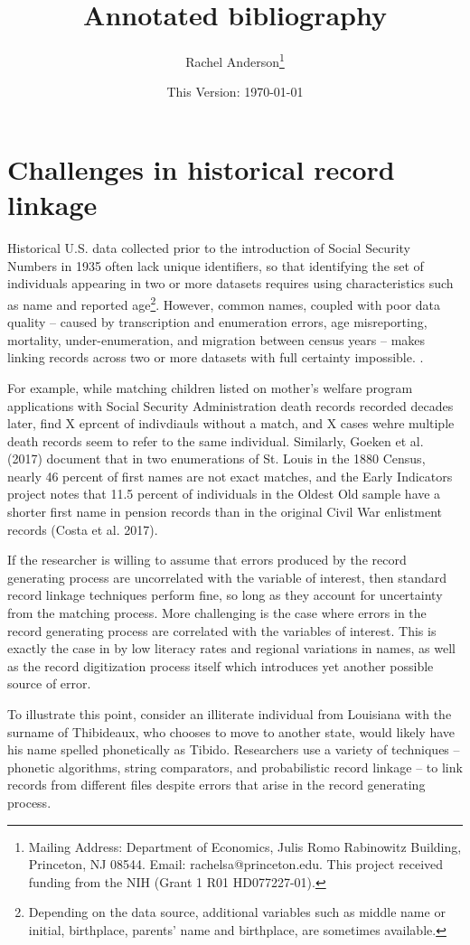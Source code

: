 \documentclass[12pt]{article}
\title{\singlespacing Annotated bibliography}
\author{\singlespacing \vspace{-50pt} Rachel Anderson\thanks{Mailing Address: Department of Economics, Julis Romo Rabinowitz Building, Princeton, NJ 08544. Email: rachelsa@princeton.edu. This project received funding from the NIH (Grant 1 R01 HD077227-01). }}
\date{\vspace{-40pt} This Version: \today}
\begin{document}
\doublespacing
\maketitle

\section{Challenges in historical record linkage}
Historical U.S. data collected prior to the introduction of Social Security Numbers in 1935 often lack unique identifiers, so that identifying the set of individuals appearing in two or more datasets requires using characteristics such as name and reported age\footnote{Depending on the data source, additional variables such as middle name or initial, birthplace, parents' name and birthplace, are sometimes available.}.  However, common names, coupled with poor data quality -- caused by transcription and enumeration errors, age misreporting, mortality, under-enumeration, and migration between census years -- makes linking records across two or more datasets with full certainty impossible. \citep{abe2019}.

For example, while matching children listed on mother's welfare program applications with Social Security Administration death records recorded decades later, \cite{aizer2016} find X eprcent of indivdiauls without a match, and X cases wehre multiple death records seem to refer to the same individual.  Similarly, Goeken et al. (2017) document that in two enumerations of St. Louis in the 1880 Census, nearly 46 percent of first names are not exact matches, and the Early Indicators project notes that 11.5 percent of individuals in the Oldest Old sample have a shorter first name in pension records than in the original Civil War enlistment records (Costa et al. 2017). 

If the researcher is willing to assume that errors produced by the record generating process are uncorrelated with the variable of interest, then standard record linkage techniques perform fine, so long as they account for uncertainty from the matching process.  More challenging is the case where errors in the record generating process are correlated with the variables of interest.  This is exactly the case in \cite{nq2015}  by low literacy rates and regional variations in names, as well as the record digitization process itself which introduces yet another possible source of error.    

To illustrate this point, consider an illiterate individual from Louisiana with the surname of Thibideaux, who chooses to move to another state, would likely have his name spelled phonetically as Tibido.  
Researchers use a variety of techniques -- phonetic algorithms, string comparators, and probabilistic record linkage -- to link records from different files despite errors that arise in the record generating process.  
\end{document}
